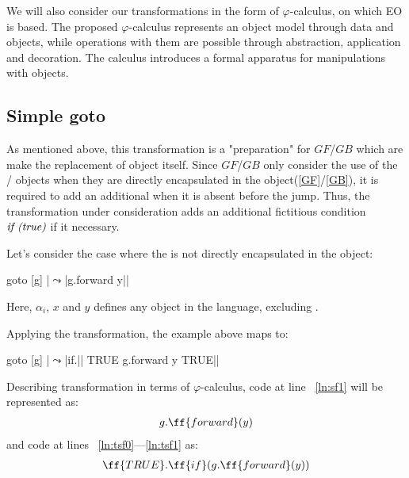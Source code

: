 \documentclass[sigplan,review,11pt,nonacm,natbib=false]{acmart}
\theoremstyle{theorems}
\begin{document}
We will also consider our transformations in the form of $\varphi$-calculus, on which EO is based.
The proposed $\varphi$-calculus represents an object model through data and objects, while operations with them are possible through abstraction, application and decoration.
The calculus introduces a formal apparatus for manipulations with objects.




\subsection{Simple goto} \label{SG}
As mentioned above, this transformation is a "preparation" for $GF$/$GB$ which are make the replacement of object  itself.
Since $GF$/$GB$ only consider the use of the / objects when they are directly encapsulated in the  object(\cref{GF}/\cref{GB}), it is required to add an additional  when it is absent before the jump.
Thus, the transformation under consideration adds an additional fictitious condition $\emph{if (true)}$ if it necessary.

Let's consider the case where the  is not directly encapsulated in the  object:
\begin{ffcode}
goto
  [g]
   |$\leadsto$|g.forward y|$\label{ln:sf1}$|
\end{ffcode}
Here, $\alpha_{i}$, $x$ and $y$ defines any object in the language, excluding .

Applying the transformation, the example above maps to:
\begin{ffcode}
goto
  [g]
   |$\leadsto$|if.|$\label{ln:tsf0}$|
      TRUE
      g.forward y
      TRUE|$\label{ln:tsf1}$|
\end{ffcode}

Describing transformation in terms of $\varphi$-calculus, code at line ~\ref{ln:sf1} will be represented as:
\begin{equation}
\begin{split}
& g.\ff{forward}( y ) \\
\end{split}
\end{equation}
and code at lines ~\ref{ln:tsf0}---\ref{ln:tsf1} as:
\begin{equation}
\begin{split}
& \ff{TRUE}.\ff{if}(g.\ff{forward}( y )) \\
\end{split}
\end{equation}
\end{document}
